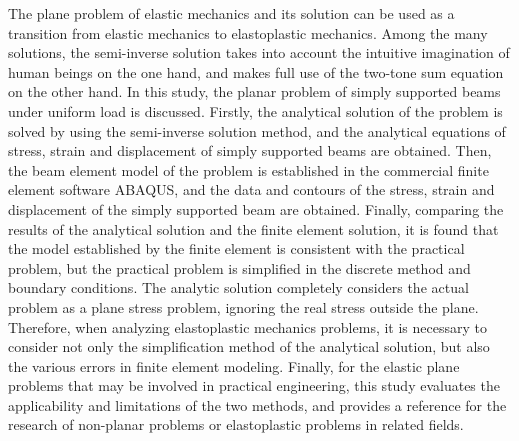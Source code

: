\begin{eabstract}
  The plane problem of elastic mechanics and its solution can be used as a transition from elastic mechanics to elastoplastic mechanics. Among the many solutions, the semi-inverse solution takes into account the intuitive imagination of human beings on the one hand, and makes full use of the two-tone sum equation on the other hand. In this study, the planar problem of simply supported beams under uniform load is discussed. Firstly, the analytical solution of the problem is solved by using the semi-inverse solution method, and the analytical equations of stress, strain and displacement of simply supported beams are obtained. Then, the beam element model of the problem is established in the commercial finite element software ABAQUS, and the data and contours of the stress, strain and displacement of the simply supported beam are obtained. Finally, comparing the results of the analytical solution and the finite element solution, it is found that the model established by the finite element is consistent with the practical problem, but the practical problem is simplified in the discrete method and boundary conditions. The analytic solution completely considers the actual problem as a plane stress problem, ignoring the real stress outside the plane. Therefore, when analyzing elastoplastic mechanics problems, it is necessary to consider not only the simplification method of the analytical solution, but also the various errors in finite element modeling. Finally, for the elastic plane problems that may be involved in practical engineering, this study evaluates the applicability and limitations of the two methods, and provides a reference for the research of non-planar problems or elastoplastic problems in related fields.
\end{eabstract}


